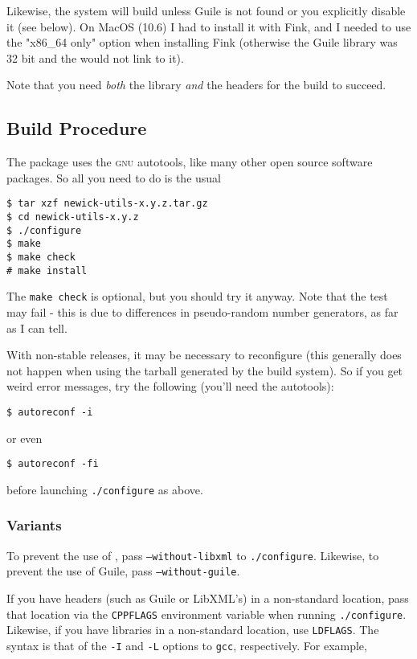 Likewise, the system will build \sched{} unless Guile is not found or you
explicitly disable it (see below). On MacOS (10.6) I had to install it with
Fink, and I needed to use the "x86\_64 only" option when installing Fink
(otherwise the Guile library was 32 bit and the \nutils{} would not link to it).

Note that you need \emph{both} the library \emph{and} the headers for the build
to succeed.

\subsection{Build Procedure}
\noindent{}The package uses the \textsc{gnu} autotools, like many other open source software packages. So all you need to do is the usual
\begin{verbatim}
$ tar xzf newick-utils-x.y.z.tar.gz
$ cd newick-utils-x.y.z
$ ./configure
$ make
$ make check
# make install
\end{verbatim}
The \texttt{make check} is optional, but you should try it anyway. Note that
the \gen{} test may fail - this is due to differences in pseudo-random number
generators, as far as I can tell.

With non-stable releases, it may be necessary to reconfigure (this generally
does not happen when using the tarball generated by the build system). So if you
get weird error messages, try the following (you'll need the \gnu{} autotools):

\begin{verbatim}
$ autoreconf -i
\end{verbatim}

or even

\begin{verbatim}
$ autoreconf -fi
\end{verbatim}

before launching \texttt{./configure} as above.

\subsubsection{Variants}

To prevent the use of \libxml, pass \texttt{--without-libxml} to
\texttt{./configure}. Likewise, to prevent the use of Guile, pass
\texttt{--without-guile}. 

If you have headers (such as Guile or LibXML's) in a non-standard location, pass
that location via the \texttt{CPPFLAGS} environment variable when running
\texttt{./configure}. Likewise, if you have libraries in a non-standard
location, use \texttt{LDFLAGS}. The syntax is that of the \texttt{-I} and
\texttt{-L} options to \texttt{gcc}, respectively. For example,

